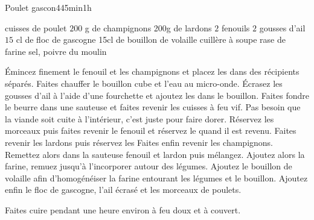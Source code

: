 \begin{recette}{Poulet gascon}{4}{45min}{1h}

\begin{ingredients}
 cuisses de poulet
\ingredient $200$ g de champignons
\ingredient 200g de lardons
\ingredient $2$ fenouils
\ingredient $2$ gousses d'ail
\ingredient $15$ cl de floc de gascogne
\ingredient 15cl de bouillon de volaille
 cuillère à soupe rase de farine
\ingredient sel, poivre du moulin
\end{ingredients}

\begin{preparation}
\etape Émincez finement le fenouil et les champignons et placez les dans des récipients séparés.
\etape Faites chauffer le bouillon cube et l'eau au micro-onde. Écrasez les gousses d'ail à l'aide d'une fourchette et ajoutez les dans le bouillon.
\etape Faites fondre le beurre dans une sauteuse et faites revenir les cuisses à feu vif. Pas besoin que la viande soit cuite à l'intérieur, c'est juste pour faire dorer.
\etape Réservez les morceaux puis faites revenir le fenouil et réservez le quand il est revenu.
\etape Faites revenir les lardons puis réservez les
\etape Faites enfin revenir les champignons.
\etape Remettez alors dans la sauteuse fenouil et lardon puis mélangez.
\etape Ajoutez alors la farine, remuez jusqu'à l'incorporer autour des légumes.
\etape Ajoutez le bouillon de volaille afin d'homogénéiser la farine entourant les légumes et le bouillon.
\etape Ajoutez enfin le floc de gascogne, l'ail écrasé et les morceaux de poulets.
\end{preparation}

\begin{cuisson}
Faites cuire pendant une heure environ à feu doux et à couvert.
\end{cuisson}

\end{recette}

